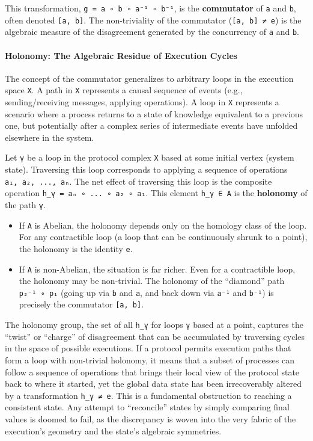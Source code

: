 \documentclass[
]{article}
\providecommand{\tightlist}{%
  \setlength{\itemsep}{0pt}\setlength{\parskip}{0pt}}
\begin{document}
This transformation, \texttt{g\ =\ a\ ∘\ b\ ∘\ a⁻¹\ ∘\ b⁻¹}, is the
\textbf{commutator} of \texttt{a} and \texttt{b}, often denoted
\texttt{{[}a,\ b{]}}. The non-triviality of the commutator
(\texttt{{[}a,\ b{]}\ ≠\ e}) is the algebraic measure of the
disagreement generated by the concurrency of \texttt{a} and \texttt{b}.

\paragraph{Holonomy: The Algebraic Residue of Execution
Cycles}\label{holonomy-the-algebraic-residue-of-execution-cycles}

The concept of the commutator generalizes to arbitrary loops in the
execution space \texttt{X}. A path in \texttt{X} represents a causal
sequence of events (e.g., sending/receiving messages, applying
operations). A loop in \texttt{X} represents a scenario where a process
returns to a state of knowledge equivalent to a previous one, but
potentially after a complex series of intermediate events have unfolded
elsewhere in the system.

Let \texttt{γ} be a loop in the protocol complex \texttt{X} based at
some initial vertex (system state). Traversing this loop corresponds to
applying a sequence of operations \texttt{a₁,\ a₂,\ ...,\ aₙ}. The net
effect of traversing this loop is the composite operation
\texttt{h\_γ\ =\ aₙ\ ∘\ ...\ ∘\ a₂\ ∘\ a₁}. This element
\texttt{h\_γ\ ∈\ A} is the \textbf{holonomy} of the path \texttt{γ}.

\begin{itemize}
\tightlist
\item
  If \texttt{A} is Abelian, the holonomy depends only on the homology
  class of the loop. For any contractible loop (a loop that can be
  continuously shrunk to a point), the holonomy is the identity
  \texttt{e}.
\item
  If \texttt{A} is non-Abelian, the situation is far richer. Even for a
  contractible loop, the holonomy may be non-trivial. The holonomy of
  the ``diamond'' path \texttt{p₂⁻¹\ ∘\ p₁} (going up via \texttt{b} and
  \texttt{a}, and back down via \texttt{a⁻¹} and \texttt{b⁻¹}) is
  precisely the commutator \texttt{{[}a,\ b{]}}.
\end{itemize}

The holonomy group, the set of all \texttt{h\_γ} for loops \texttt{γ}
based at a point, captures the ``twist'' or ``charge'' of disagreement
that can be accumulated by traversing cycles in the space of possible
executions. If a protocol permits execution paths that form a loop with
non-trivial holonomy, it means that a subset of processes can follow a
sequence of operations that brings their local view of the protocol
state back to where it started, yet the global data state has been
irrecoverably altered by a transformation \texttt{h\_γ\ ≠\ e}. This is a
fundamental obstruction to reaching a consistent state. Any attempt to
``reconcile'' states by simply comparing final values is doomed to fail,
as the discrepancy is woven into the very fabric of the execution's
geometry and the state's algebraic symmetries.
\end{document}
